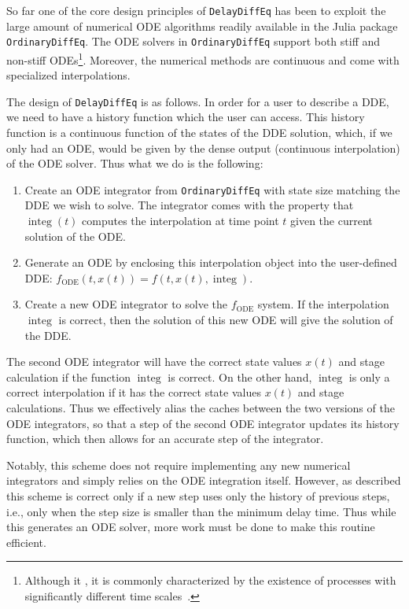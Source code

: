 \documentclass{juliacon}
\def\pkg#1{\texttt{#1}}
\begin{document}
So far one of the core design principles of \pkg{DelayDiffEq} has been to exploit
the large amount of numerical ODE algorithms readily available in the Julia
package \pkg{OrdinaryDiffEq}. The ODE solvers in \pkg{OrdinaryDiffEq} support both stiff
and non-stiff ODEs\footnote{Although it
, it is commonly characterized
by the existence of processes with significantly different time
scales~\cite{burrage95_parallel_sequential_methods,dahlquist75_recent_work_stiff}.}.
Moreover, the numerical methods are continuous and come with specialized interpolations.

The design of \pkg{DelayDiffEq} is as follows. In order for a user to describe a DDE, we need
to have a history function which the user can access. This history function is a continuous
function of the states of the DDE solution, which, if we only had an ODE, would be given
by the dense output (continuous interpolation) of the ODE solver. Thus what we do is the
following:

\begin{enumerate}
    \item Create an ODE integrator from \pkg{OrdinaryDiffEq} with state size matching the DDE we wish to solve. The integrator comes with the property that $\operatorname{integ}(t)$ computes the interpolation at time point $t$ given the current solution of the ODE.
    \item Generate an ODE by enclosing this interpolation object into the user-defined DDE: $f_{\text{ODE}}(t,x(t)) = f(t,x(t),\operatorname{integ})$.
    \item Create a new ODE integrator to solve the $f_{\text{ODE}}$ system. If the interpolation $\operatorname{integ}$ is correct, then the solution of this new ODE will give the solution of the DDE.
\end{enumerate}

The second ODE integrator will have the correct state values $x(t)$ and stage calculation if the function $\operatorname{integ}$ is correct.
On the other hand, $\operatorname{integ}$ is only a correct interpolation if it has the correct state values $x(t)$ and stage calculations.
Thus we effectively alias the caches between the two versions of the ODE integrators, so that a step of the second ODE integrator updates its history function, which then allows for an accurate step of the integrator.

Notably, this scheme does not require implementing any new numerical integrators and simply relies on the ODE integration itself.
However, as described this scheme is correct only if a new step uses only the history of previous steps, i.e., only when the step size is smaller than the minimum delay time.
Thus while this generates an ODE solver, more work must be done to make this routine efficient.
\end{document}
